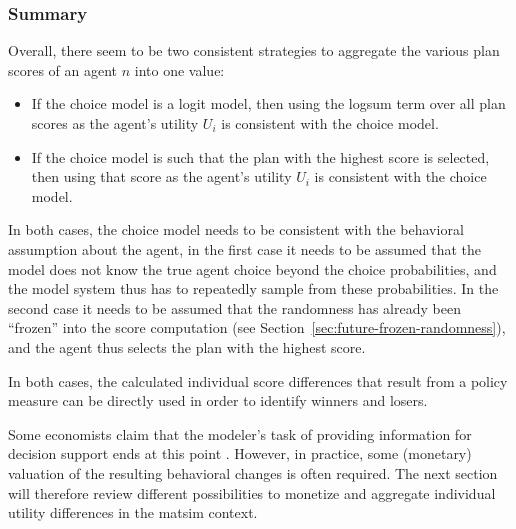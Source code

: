 

\subsubsection{Summary}
\label{ch:economicEval:valuingBehavior:output2Eval:summary}

Overall, there seem to be two consistent strategies to aggregate the various plan scores of an agent $n$ into one value:
\begin{itemize}\styleItemize

\item If the choice model is a logit model, then using the logsum term over all plan scores as the agent's utility $U_i$ is consistent with the choice model.

\item If the choice model is such that the plan with the highest score is selected, then using that score as the agent's utility $U_i$ is consistent with the choice model.

\end{itemize}
In both cases, the choice model needs to be consistent with the behavioral assumption about the agent, \ie in the first case it needs to be assumed that the model does not know the true agent choice beyond the choice probabilities, and the model system thus has to repeatedly sample from these probabilities.  In the second case it needs to be assumed that the randomness has already been ``frozen'' into the score computation (see Section~\ref{sec:future-frozen-randomness}), and the agent thus selects the plan with the highest score.
%

%
In both cases, the calculated individual score differences that result from a policy measure can be directly used in order to identify winners and losers.
%

Some economists claim that the modeler's task of providing information for decision support ends at this point \citep{AhlheimRose1989MessungIndividuellerWohlfahrt}. However, in practice, some (monetary) valuation of the resulting behavioral changes is often required. The next section will therefore review different possibilities to monetize and aggregate individual utility differences in the \acrshort{matsim} context.

